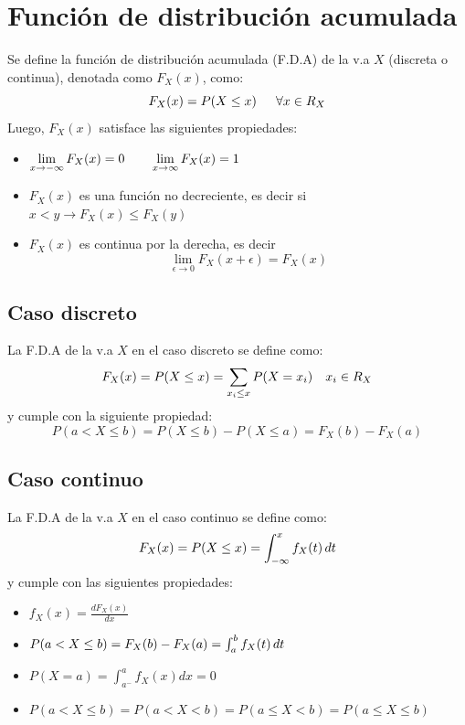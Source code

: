 \documentclass[12pt,twocolumn,a4paper]{report}
\begin{document}
\section*{Función de distribución acumulada}
Se define la función de distribución acumulada (F.D.A) de la v.a $X$ (discreta o continua), denotada como $F_X(x)$, como: 
$$
F_X(x) = P(X \leq x) \hspace{15px} \forall x \in R_X
$$
Luego, $F_X(x)$ satisface las siguientes propiedades:
\begin{itemize}
\setlength\itemsep{0.001cm}
\item{$\displaystyle \lim_{x \to -\infty} F_X(x) = 0 \hspace{20px} \displaystyle \lim_{x \to \infty} F_X(x) = 1$}
\item{$F_X(x)$ es una función no decreciente, es decir si $x < y \rightarrow F_X(x) \leq F_X(y)$}
\item{$F_X(x)$ es continua por la derecha, es decir
$$
\displaystyle \lim_{\epsilon \to 0}F_X(x + \epsilon) = F_X(x)
$$}
\end{itemize}

\subsection*{Caso discreto}
La F.D.A de la v.a $X$ en el caso discreto se define como:
$$
F_X(x) = P(X \leq x) = \sum_{x_i \leq x}P(X = x_i) \hspace{10px} x_i \in R_X
$$
y cumple con la siguiente propiedad: 
$$
P(a < X \leq b) = P(X \leq b) - P(X \leq a) = F_X(b) - F_X(a)
$$

\subsection*{Caso continuo}
La F.D.A de la v.a $X$ en el caso continuo se define como:
$$
F_X(x) = P(X \leq x) = \int_{-\infty}^{x} f_X(t)\thinspace dt 
$$
y cumple con las siguientes propiedades:
\begin{itemize}
\setlength\itemsep{0.001cm}
\item{$f_X(x) = \frac{dF_X(x)}{dx}$}
\item{$P(a<X\leq b)=F_X(b) - F_X(a) = \int_{a}^{b}f_X(t)\thinspace dt$}
\item{$P(X=a) = \int_{a^-}^{a} f_X(x) dx = 0$}
\item{$P(a < X \leq b) = P(a < X <b) = P(a \leq X < b) = P(a \leq X \leq b)$}
\end{itemize}
\end{document}
